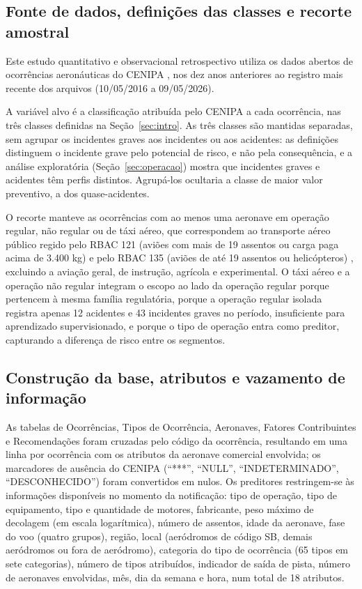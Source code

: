 \documentclass[12pt]{article}
\begin{document}
    \subsection{Fonte de dados, definições das classes e recorte amostral}
    \label{sec:fonte}

    Este estudo quantitativo e observacional retrospectivo utiliza os dados abertos de ocorrências aeronáuticas do CENIPA \cite{cenipa:ocorrencias,cenipa:painelsipaer}, nos dez anos anteriores ao registro mais recente dos arquivos (10/05/2016 a 09/05/2026).

    A variável alvo é a classificação atribuída pelo CENIPA a cada ocorrência, nas três classes definidas na Seção~\ref{sec:intro}. As três classes são mantidas separadas, sem agrupar os incidentes graves aos incidentes ou aos acidentes: as definições distinguem o incidente grave pelo potencial de risco, e não pela consequência, e a análise exploratória (Seção~\ref{sec:operacao}) mostra que incidentes graves e acidentes têm perfis distintos. Agrupá-los ocultaria a classe de maior valor preventivo, a dos quase-acidentes.

    O recorte manteve as ocorrências com ao menos uma aeronave em operação regular, não regular ou de táxi aéreo, que correspondem ao transporte aéreo público regido pelo RBAC 121 (aviões com mais de 19 assentos ou carga paga acima de 3.400 kg) e pelo RBAC 135 (aviões de até 19 assentos ou helicópteros) \cite{anac:rbac121,anac:rbac135}, excluindo a aviação geral, de instrução, agrícola e experimental. O táxi aéreo e a operação não regular integram o escopo ao lado da operação regular porque pertencem à mesma família regulatória, porque a operação regular isolada registra apenas 12 acidentes e 43 incidentes graves no período, insuficiente para aprendizado supervisionado, e porque o tipo de operação entra como preditor, capturando a diferença de risco entre os segmentos.

    \subsection{Construção da base, atributos e vazamento de informação}
    \label{sec:atributos}

    As tabelas de Ocorrências, Tipos de Ocorrência, Aeronaves, Fatores Contribuintes e Recomendações foram cruzadas pelo código da ocorrência, resultando em uma linha por ocorrência com os atributos da aeronave comercial envolvida; os marcadores de ausência do CENIPA (``***'', ``NULL'', ``INDETERMINADO'', ``DESCONHECIDO'') foram convertidos em nulos. Os preditores restringem-se às informações disponíveis no momento da notificação: tipo de operação, tipo de equipamento, tipo e quantidade de motores, fabricante, peso máximo de decolagem (em escala logarítmica), número de assentos, idade da aeronave, fase do voo (quatro grupos), região, local (aeródromos de código SB, demais aeródromos ou fora de aeródromo), categoria do tipo de ocorrência (65 tipos em sete categorias), número de tipos atribuídos, indicador de saída de pista, número de aeronaves envolvidas, mês, dia da semana e hora, num total de 18 atributos.
\end{document}
